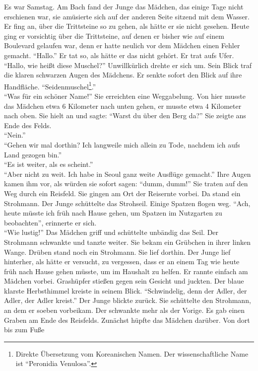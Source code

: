 \documentclass[prd,12pt,tightenlines,notitlepage,nofootinbib]{revtex4-1}
\begin{document}
Es war Samstag.  Am Bach fand der Junge das Mädchen, das einige
Tage nicht erschienen war, sie amüsierte sich auf der anderen Seite sitzend mit dem Wasser.  Er fing an, über die Trittsteine so zu gehen, als hätte er sie
nicht gesehen.  Heute ging er vorsichtig über die Trittsteine, auf denen
er bisher wie auf einem Boulevard gelaufen war, denn er hatte neulich vor dem
Mädchen einen Fehler gemacht.  "`Hallo."'  Er tat so, als hätte er das nicht
gehört.  Er trat aufs Ufer.  "`Hallo, wie heißt diese Muschel?"'
Unwillkürlich drehte er sich um.  Sein Blick traf die klaren schwarzen
Augen des Mädchens.  Er senkte sofort den Blick auf ihre Handfläche.
"`Seidenmuschel\footnote{Direkte Übersetzung vom Koreanischen Namen.
  Der wissenschaftliche Name ist "`Peronidia Venulosa"'.}."'\\
"`Was für ein schöner Name!"'  Sie erreichten eine Weggabelung.
Von hier musste das Mädchen etwa 6 Kilometer nach unten gehen, er musste
etwa 4 Kilometer nach oben.  Sie hielt an und sagte: "`Warst du über den
Berg da?"'  Sie zeigte ans Ende des Felds.\\
"`Nein."'\\
"`Gehen wir mal dorthin?
Ich langweile mich allein zu Tode, nachdem ich aufs Land
gezogen bin."'\\
"`Es ist weiter, als es scheint."'\\
"`Aber nicht zu weit.
Ich habe in Seoul ganz weite Ausflüge gemacht."'  Ihre Augen kamen ihm
vor, als würden sie sofort sagen: "`dumm, dumm!"'  Sie traten auf den Weg
durch ein Reisfeld.  Sie gingen am Ort der Reisernte vorbei.
Da stand ein Strohmann.  Der Junge schüttelte das Strohseil.  Einige
Spatzen flogen weg.  "`Ach, heute müsste ich früh nach Hause gehen, um
Spatzen im Nutzgarten zu beobachten"', erinnerte er sich.\\
"`Wie lustig!"'
Das Mädchen griff und schüttelte unbändig das Seil.  Der Strohmann schwankte und
tanzte weiter.  Sie bekam ein Grübchen in ihrer linken Wange.  Drüben
stand noch ein Strohmann.  Sie lief dorthin.  Der Junge lief hinterher,
als hätte er versucht, zu vergessen, dass er an einem Tag wie heute
früh nach Hause gehen müsste, um im Haushalt zu helfen.  Er rannte
einfach am Mädchen vorbei.  Grashüpfer stießen gegen sein
Gesicht und juckten.  Der blaue klarste Herbsthimmel kreiste in seinem Blick.
"`Schwindelig, denn der Adler, der Adler, der Adler kreist."'  Der Junge blickte
zurück.  Sie schüttelte den Strohmann, an dem er soeben vorbeikam.  Der
schwankte mehr als der Vorige.  Es gab einen Graben am Ende des
Reisfelds.  Zunächst hüpfte das Mädchen darüber.  Von dort bis zum Fuße
\end{document}
